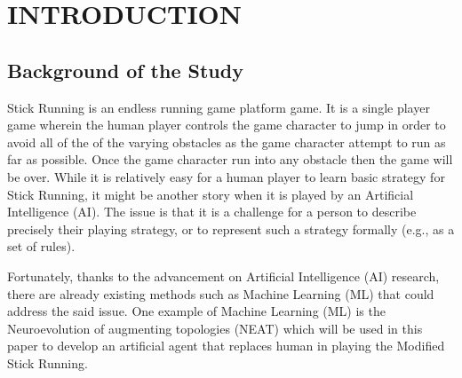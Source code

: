 \documentclass[journal]{IEEEtran}
\title{\SPTITLE}
\author{\ADVISEE~and~\ADVISER%
\REMARK
}
\begin{document}
\maketitle
\pagestyle{headings}

\begin{abstract}
In this work, an artificial game player for the Modified Stick Running was created using the NeuroEvolution of Augmenting Topologies (NEAT) algorithm. NEAT was used to evolve the neural network of the game agent to play the game indefinitely. Game states are represented using three features including the height and width of the nearest obstacle and also its distance to the game agent. The fitness of the agent is the combination of its score and traveled distance. The Algorithm was run for 30 trials with a maximum allowable generation of 30 and a maximum scoring of 50 points. The experiment has shown that the NEAT algorithm has a success rate of 83.33 percent and an average of breakthrough at 16.8 generations.
\end{abstract}

\section{INTRODUCTION}

\subsection{Background of the Study}

Stick Running is an endless running game platform game. It is a single player game wherein the human player controls the game character to jump in order to avoid all of the of the varying obstacles as the game character attempt to run as far as possible. Once the game character run into any obstacle then the game will be over. While it is relatively easy for a human player to learn basic strategy for Stick Running, it might be another story when it is played by an Artificial Intelligence (AI). The issue is that it is a challenge for a person to describe precisely their playing strategy, or to represent such a strategy formally (e.g., as a set of rules).

Fortunately, thanks to the advancement on Artificial Intelligence (AI) research, there are already existing methods such as Machine Learning (ML) that could address the said issue. One example of Machine Learning (ML) is the Neuroevolution of augmenting topologies (NEAT) which will be used in this paper to develop an artificial agent that replaces human in playing the Modified Stick Running.
\end{document}
